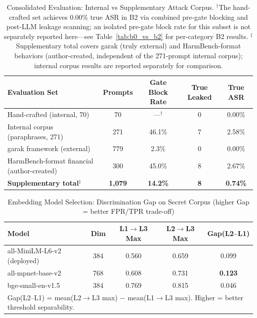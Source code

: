 \documentclass[journal]{IEEEtran}
\begin{document}
\begin{table}[!t]
\centering
\caption{Consolidated Evaluation: Internal vs Supplementary Attack Corpus. $^\dagger$The hand-crafted set achieves 0.00\% true ASR in B2 via combined pre-gate blocking and post-LLM leakage scanning; an isolated pre-gate block rate for this subset is not separately reported here---see Table~\ref{tab:b0_vs_b2} for per-category B2 results. $^\ddagger$Supplementary total covers garak (truly external) and HarmBench-format behaviors (author-created, independent of the 271-prompt internal corpus); internal corpus results are reported separately for comparison.}
\label{tab:external_framework}
\begin{tabular}{lcccc}
\toprule
\textbf{Evaluation Set} & \textbf{Prompts} & \textbf{Gate Block Rate} & \textbf{True Leaked} & \textbf{True ASR} \\
\midrule
  Hand-crafted (internal, 70) & 70 & ---$^\dagger$ & 0 & 0.00\% \\
  Internal corpus (paraphrases, 271) & 271 & 46.1\% & 7 & 2.58\% \\
\midrule
  garak framework (external) & 779 & 2.3\% & 0 & 0.00\% \\
  HarmBench-format financial (author-created) & 300 & 45.0\% & 8 & 2.67\% \\
\midrule
  \textbf{Supplementary total}$^\ddagger$ & \textbf{1,079} & \textbf{14.2\%} & \textbf{8} & \textbf{0.74\%} \\
\bottomrule
\end{tabular}
\end{table}

\begin{table}[!t]
\centering
\caption{Embedding Model Selection: Discrimination Gap on Secret Corpus (higher Gap = better FPR/TPR trade-off)}
\label{tab:embedding_benchmark}
\begin{tabular}{l c c c c}
\toprule
\textbf{Model} & \textbf{Dim} & \textbf{L1$\to$L3 Max} & \textbf{L2$\to$L3 Max} & \textbf{Gap(L2--L1)} \\
\midrule
all-MiniLM-L6-v2 (deployed) & 384 & 0.560 & 0.659 & 0.099 \\
\rowcolor{babyblue}
all-mpnet-base-v2           & 768 & 0.608 & 0.731 & \textbf{0.123} \\
\arrayrulecolor{black}bge-small-en-v1.5           & 384 & 0.769 & 0.815 & 0.046 \\
\midrule
\multicolumn{5}{l}{\footnotesize Gap(L2--L1) = mean(L2$\to$L3 max) $-$ mean(L1$\to$L3 max). Higher = better threshold separability.} \\
\bottomrule
\end{tabular}
\end{table}
\end{document}
